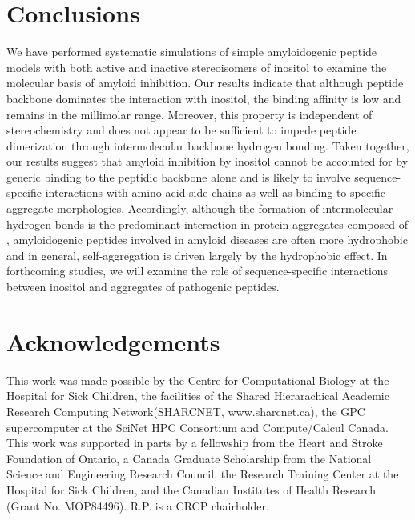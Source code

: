 \section{Conclusions}
We have performed systematic simulations of simple amyloidogenic peptide models with both active and inactive stereoisomers of inositol to examine the molecular basis of amyloid inhibition. Our results indicate that although peptide backbone dominates the interaction with inositol, the binding affinity is low and remains in the millimolar range. Moreover, this property is independent of stereochemistry and does not appear to be sufficient to impede peptide dimerization through intermolecular backbone hydrogen bonding. Taken together, our results suggest that amyloid inhibition by inositol cannot be accounted for by generic binding to the peptidic backbone alone and is likely to involve sequence-specific interactions with amino-acid side chains as well as binding to specific aggregate morphologies. Accordingly, although the formation of intermolecular hydrogen bonds is the predominant interaction in protein aggregates composed of \gafour, amyloidogenic peptides involved in amyloid diseases are often more hydrophobic and in general, self-aggregation is driven largely by the hydrophobic effect.\cite{Chiti:2006p20} In forthcoming studies, we will examine the role of sequence-specific interactions between inositol and aggregates of pathogenic peptides.

\section{Acknowledgements}
This work was made possible by the Centre for Computational Biology at the Hospital for Sick Children, the facilities of the Shared Hierarachical Academic Research Computing Network(SHARCNET, www.sharcnet.ca), the GPC supercomputer at the SciNet HPC Consortium and Compute/Calcul Canada. This work was supported in parts by a fellowship from the Heart and Stroke Foundation of Ontario, a Canada Graduate Scholarship from the National Science and Engineering Research Council, the Research Training Center at the Hospital for Sick Children, and the Canadian Institutes of Health Research (Grant No. MOP84496). R.P. is a CRCP chairholder.



